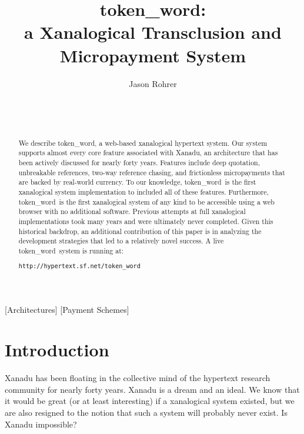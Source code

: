 \documentclass{acm_proc_article-sp}
\newcommand{\tokenWord}{token\_word}
\begin{document}
\title{\tokenWord:\\a Xanalogical Transclusion and Micropayment System}



\author{
\alignauthor Jason Rohrer\\
    \\
    \\
    \\
}

\maketitle



\begin{abstract}
We describe \tokenWord, a web-based xanalogical hypertext system.  
Our system supports almost every core feature associated with Xanadu, an architecture that has been actively discussed for nearly forty years.
Features include deep quotation, unbreakable references, two-way reference chasing, and frictionless micropayments that are backed by real-world currency.
To our knowledge, \tokenWord \  is the first xanalogical system implementation to included all of these features.  Furthermore, \tokenWord \  is the first xanalogical system of any kind to be accessible using a web browser with no additional software.
Previous attempts at full xanalogical implementations took many years and were ultimately never completed.
Given this historical backdrop, an additional contribution of this paper is in analyzing the development strategies that led to a relatively novel success.
A live \tokenWord \  system is running at:

\centering\texttt{http://hypertext.sf.net/token\_word}

\end{abstract}

[Architectures]
[Payment Schemes]




\section{Introduction}
\label{sec:Introduction}
Xanadu has been floating in the collective mind of the hypertext research community for nearly forty years.
Xanadu is a dream and an ideal.  
We know that it would be great (or at least interesting) if a xanalogical system existed, but we are also resigned to the notion that such a system will probably never exist.
Is Xanadu impossible?
\end{document}
